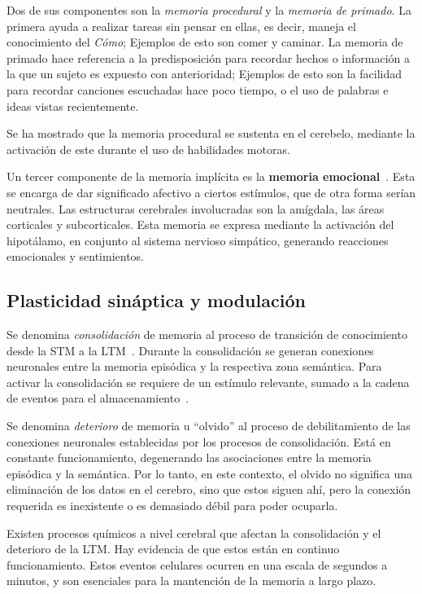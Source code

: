 Dos de sus componentes son la \textit{memoria procedural} y la \textit{memoria de primado}. La primera ayuda a realizar tareas sin pensar en ellas, es decir, maneja el conocimiento del \textit{Cómo}; Ejemplos de esto son comer y caminar. La memoria de primado hace referencia a la predisposición para recordar hechos o información a la que un sujeto es expuesto con anterioridad; Ejemplos de esto son la facilidad para recordar canciones escuchadas hace poco tiempo, o el uso de palabras e ideas vistas recientemente.

Se ha mostrado que la memoria procedural se sustenta en el cerebelo, mediante la activación de este durante el uso de habilidades motoras.

Un tercer componente de la memoria implícita es la \textbf{memoria emocional}~\cite{episodic_philip}. Esta se encarga de dar significado afectivo a ciertos estímulos, que de otra forma serían neutrales. Las estructuras cerebrales involucradas son la amígdala, las áreas corticales y subcorticales. Esta memoria se expresa mediante la activación del hipotálamo, en conjunto al sistema nervioso simpático, generando reacciones emocionales y sentimientos.


\subsection{Plasticidad sináptica y modulación}

Se denomina \textit{consolidación} de memoria al proceso de transición de conocimiento desde la STM a la LTM~\cite{Bailey13445}. Durante la consolidación se generan conexiones neuronales entre la memoria episódica y la respectiva zona semántica. Para activar la consolidación se requiere de un estímulo relevante, sumado a la cadena de eventos para el almacenamiento~\cite{Eichenbaum:2008}.

Se denomina \textit{deterioro} de memoria u ``olvido'' al proceso de debilitamiento de las conexiones neuronales establecidas por los procesos de consolidación. Está en constante funcionamiento, degenerando las asociaciones entre la memoria episódica y la semántica. Por lo tanto, en este contexto, el olvido no significa una eliminación de los datos en el cerebro, sino que estos siguen ahí, pero la conexión requerida es inexistente o es demasiado débil para poder ocuparla.

Existen procesos químicos a nivel cerebral que afectan la consolidación y el deterioro de la LTM. Hay evidencia de que estos están en continuo funcionamiento. Estos eventos celulares ocurren en una escala de segundos a minutos, y son esenciales para la mantención de la memoria a largo plazo.

